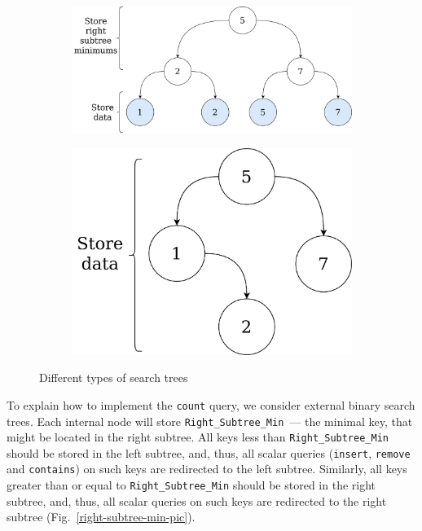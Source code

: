\documentclass[times, dvipsnames,%
               languages={russian,english} %
              ]{itmo-student-thesis}
\begin{document}
\begin{figure}[H]
     \centering
     \begin{subfigure}[b]{0.55\linewidth}
          \centering
          \includegraphics[width=\linewidth]{pics/external-tree.png}
          \label{external-tree-pic}
     \end{subfigure}
     \hfill
     \begin{subfigure}[b]{0.35\linewidth}
          \centering
          \includegraphics[width=\linewidth]{pics/internal-tree.png}
          \label{internal-tree-pic}
     \end{subfigure}
    \caption{Different types of search trees}
    \label{internal-external-trees-pic}
\end{figure}

To explain how to implement the \texttt{count} query, we consider external binary search trees. Each internal node will store \texttt{Right\_Subtree\_Min}~--- the minimal key, that might be located in the right subtree. All keys less than \texttt{Right\_Subtree\_Min} should be stored in the left subtree, and, thus, all scalar queries (\texttt{insert}, \texttt{remove} and \texttt{contains}) on such keys are redirected to the left subtree. Similarly, all keys greater than or equal to \texttt{Right\_Subtree\_Min} should be stored in the right subtree, and, thus, all scalar queries on such keys are redirected to the right subtree (Fig.~\ref{right-subtree-min-pic}).
\end{document}
